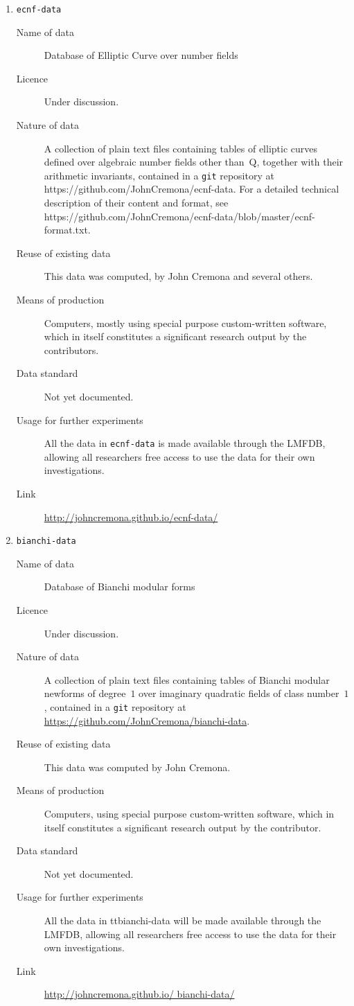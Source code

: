 \documentclass{../../Proposal/LaTeX-proposal/deliverablereport}
\begin{document}
\begin{enumerate}
\item{{\tt ecnf-data}}
\begin{description}
\item[Name of data] Database of Elliptic Curve over number fields \item[Licence]  Under discussion.
\item[Nature of data] A collection of plain text files containing tables of elliptic curves defined over algebraic number fields other than~Q, together with their arithmetic invariants, contained in a {\tt git} repository at https://github.com/JohnCremona/ecnf-data. For a detailed technical description of their content and format,  see https://github.com/JohnCremona/ecnf-data/blob/master/ecnf-format.txt.
\item[Reuse of existing data] This data was computed, by John Cremona and several others.
\item[Means of production] Computers, mostly using special purpose custom-written software, which in itself constitutes a significant research output by the contributors.
\item[Data standard] Not yet documented.
\item [Usage for further experiments] All the data in {\tt ecnf-data} is made available through the LMFDB, allowing all researchers free access to use the data for their own investigations.
\item [Link] \url{http://johncremona.github.io/ecnf-data/}
\end{description}

\item{{\tt bianchi-data}}
\begin{description}
\item[Name of data] Database of Bianchi modular forms
\item[Licence]  Under discussion.
\item[Nature of data] A collection of plain text files containing tables of Bianchi modular newforms of degree~$1$ over imaginary quadratic fields of class number~$1$, contained in a {\tt git} repository at \url{https://github.com/JohnCremona/bianchi-data}.
\item[Reuse of existing data] This data was computed by John Cremona.
\item[Means of production] Computers, using special purpose custom-written software, which in itself constitutes a significant research output by the contributor.
\item[Data standard] Not yet documented.
\item [Usage for further experiments] All the data in {ttbianchi-data} will be made available through the LMFDB, allowing all researchers free access to use the data for their own investigations.
\item [Link] \url{http://johncremona.github.io/ bianchi-data/}
\end{description}




\end{enumerate}
\end{document}
